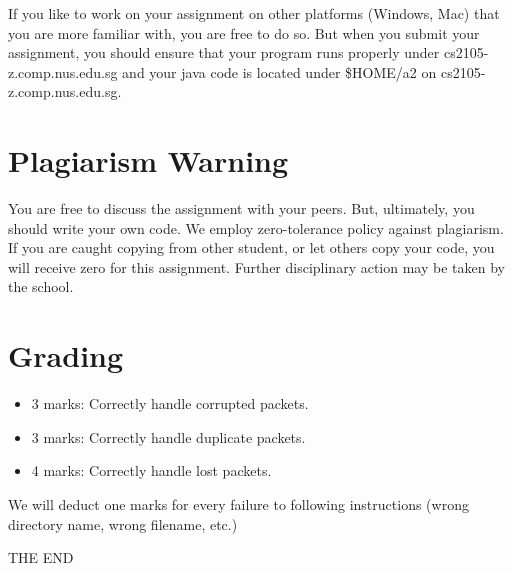 \documentclass[a4paper,11pt]{exam}
\begin{document}
If you like to work on your assignment on other platforms (Windows, Mac) that you are more familiar with, you are free to do so. But when you submit your assignment, you should ensure that your program runs properly under cs2105-z.comp.nus.edu.sg and your java code is located under \$HOME/a2 on cs2105-z.comp.nus.edu.sg.

\section*{Plagiarism Warning}

You are free to discuss the assignment with your peers. But, ultimately, you should write your own code. We employ zero-tolerance policy against plagiarism. If you are caught copying from other student, or let others copy your code, you will receive zero for this assignment. Further disciplinary action may be taken by the school.

\section*{Grading}

\begin{itemize}
\item 3 marks: Correctly handle corrupted packets.
\item 3 marks: Correctly handle duplicate packets.
\item 4 marks: Correctly handle lost packets.
\end{itemize}

We will deduct one marks for every failure to following instructions (wrong directory name, wrong filename, etc.)

\vfill
\center\Huge{THE END}
\end{document}
